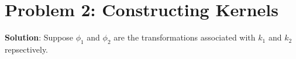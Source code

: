 \documentclass{article}
\begin{document}
	\section*{Problem 2: Constructing Kernels}
	\begin{comment}
		In class, we have shown how we could use a few rules to construct new kernels from existing valid kernels. In this problem, we will prove that these rules indeed produce valid kernels.
		\newline
		Recall that there are two ways to show that a function $k: \mathbb{R}^d \times \mathbb{R}^d \rightarrow \mathbb{R}$ is a valid kernel function:
		\begin{enumerate}
		\item The matrix $$K_{ij} = k(\vec{x}_i, \vec{x}_j)$$ is symmetric and positive semidefinite for any set of vectors $\vec{x}_1, ..., \vec{x}_n \in \mathbb{R}^d$
		\item $k(\vec{x}_i, \vec{x}_j) = \phi(\vec{x}_i)^T \phi(\vec{x}_j)$ for some transformation
		$\phi$
		\end{enumerate}
		Suppose $k_1, k_2$ are valid kernel functions. Show that the following kernels are valid:
		\begin{enumerate}[(a)]
		\item $k(\vec{x}_1, \vec{x}_2) = c k_1(\vec{x}_1, \vec{x}_2)$ for any $c \geq 0$. 
		\item $k(\vec{x}_1, \vec{x}_2) = k_1(\vec{x}_1, \vec{x}_2) + k_2(\vec{x}_1, \vec{x}_2)$ 
		\item $k(\vec{x}_1, \vec{x}_2) = k_1(\vec{x}_1, \vec{x}_2) k_2(\vec{x}_1, \vec{x}_2)$.
		\end{enumerate}
	\end{comment}
    \textbf{Solution}:
    Suppose $\phi_1$ and $\phi_2$ are the transformations associated with $k_1$ and $k_2$ repsectively.
\end{document}
